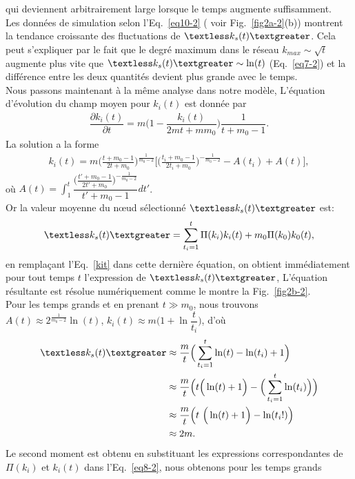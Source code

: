 qui deviennent arbitrairement large lorsque le temps augmente suffisamment. \\
Les données de simulation selon l'Eq.~\eqref{eq10-2} ( voir Fig.~\ref{fig2a-2}(b)) montrent la tendance croissante des fluctuations de $\kms$.
Cela peut s'expliquer par le fait que le degré maximum dans le réseau $k_{max}\sim \sqrt{t}$ \cite{Cohen-Havlinl2010} augmente plus vite que $\kms\sim \ln(t)$ (Eq.~\eqref{eq7-2}) et la différence entre les deux quantités devient plus grande avec le temps. \\
Nous passons maintenant à la même analyse dans notre modèle,  L'équation d'évolution du champ moyen pour $k_i(t)$ est donnée par
\begin{eqnarray}
\dfrac{\partial k_i(t)}{\partial t}=m\Big(1-\dfrac{k_i(t)}{2mt+mm_0}\Big)\dfrac{1}{t+m_0-1}.
\end{eqnarray}
La solution a la forme
\begin{eqnarray}
k_i(t)=m \Big(\frac{t+m_0-1}{2t+m_0}\Big)^{\frac{1}{m_0-2}}\Bigg[\Big(\frac{t_i+m_0-1}{2t_i+m_0}\Big)^{-\frac{1}{m_0-2}}-A(t_i)
+A(t)\Bigg],
\label{kit}
\end{eqnarray}
où $A(t)=\displaystyle \int_1^{t}\dfrac{\Big(\frac{t'+m_0-1}{2t'+m_0}\Big)^{-\frac{1}{m_0-2}}}{t'+m_0-1}dt'$.\\
Or la valeur moyenne du nœud sélectionné $\kms$ est: 
\begin{eqnarray}
\kms=\sum_{t_i=1}^t\Pi(k_i)k_i(t)+m_0\Pi(k_0)k_0(t),
\label{kms-2}
\end{eqnarray}
en remplaçant l'Eq.~\eqref{kit} dans cette dernière équation, on obtient immédiatement pour tout temps $t$ l'expression de $\kms$, L'équation résultante est résolue numériquement comme le montre la Fig.~\ref{fig2b-2}. \\
Pour les temps grands et en prenant $t \gg m_0$, nous trouvons 
$A(t)\approx 2^{\frac{1}{m_0-2}} \ln(t)$, $k_i(t)\approx m\Big(1+\ln \dfrac{t}{t_i}\Big)$, d'où
\begin{align}
\label{kom}
\kms&\approx\dfrac{m}{t}\Big(\sum_{t_i=1}^{t} \ln(t)-\ln(t_i)+1\Big)\\
&\approx\dfrac{m}{t}\Big(t \Big(\ln(t)+1\Big)-\Big(\sum_{t_i=1}^{t} \ln(t_i)\Big)\Big) \nonumber \\
&\approx\dfrac{m}{t}\Big(t\ \Big(\ln(t)+1\Big)-\ln(t_i!)\Big) \nonumber \\
&\approx2m. \nonumber
\end{align}
Le second moment est obtenu en substituant les expressions correspondantes de $\Pi(k_i)$ et $k_i(t)$ dans l'Eq.~\eqref {eq8-2}, nous obtenons pour les temps grands
